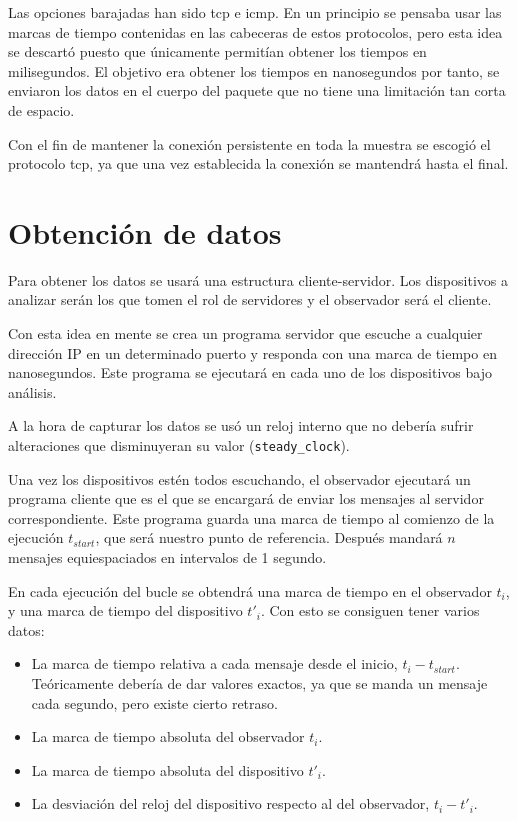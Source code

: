 Las opciones barajadas han sido \acrfull{tcp} e \acrfull{icmp}. En un principio se pensaba usar las marcas de tiempo contenidas en las cabeceras de estos protocolos, pero esta idea se descartó puesto que únicamente permitían obtener los tiempos en milisegundos. El objetivo era obtener los tiempos en nanosegundos por tanto, se enviaron los datos en el cuerpo del paquete que no tiene una limitación tan corta de espacio. 

Con el fin de mantener la conexión persistente en toda la muestra se escogió el protocolo \acrshort{tcp}, ya que una vez establecida la conexión se mantendrá hasta el final.

\section{Obtención de datos}

Para obtener los datos se usará una estructura cliente-servidor. Los dispositivos a analizar serán los que tomen el rol de servidores y el observador será el cliente.

Con esta idea en mente se crea un programa servidor que escuche a cualquier dirección IP en un determinado puerto y responda con una marca de tiempo en nanosegundos. Este programa se ejecutará en cada uno de los dispositivos bajo análisis.

A la hora de capturar los datos se usó un reloj interno que no debería sufrir alteraciones que disminuyeran su valor (\texttt{steady\_clock}\cite{steadyclockcpp}).

Una vez los dispositivos estén todos escuchando, el observador ejecutará un programa cliente que es el que se encargará de enviar los mensajes al servidor correspondiente. Este programa guarda una marca de tiempo al comienzo de la ejecución $t_{start}$, que será nuestro punto de referencia. Después mandará $n$ mensajes equiespaciados en intervalos de 1 segundo.

En cada ejecución del bucle se obtendrá una marca de tiempo en el observador $t_i$, y una marca de tiempo del dispositivo $t'_i$. Con esto se consiguen tener varios datos:
\begin{itemize}
    \item La marca de tiempo relativa a cada mensaje desde el inicio, $t_i - t_{start}$. Teóricamente debería de dar valores exactos, ya que se manda un mensaje cada segundo, pero existe cierto retraso.
    \item La marca de tiempo absoluta del observador $t_i$.
    \item La marca de tiempo absoluta del dispositivo $t'_i$.
    \item La desviación del reloj del dispositivo respecto al del observador, $t_i - t'_i$.
\end{itemize}

